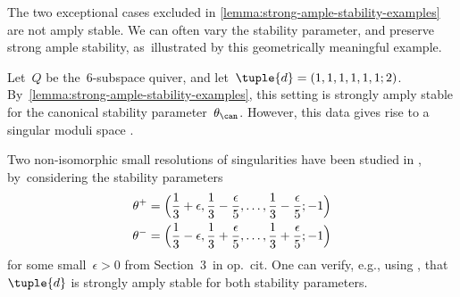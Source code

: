 The two exceptional cases excluded in \cref{lemma:strong-ample-stability-examples}
are not amply stable.
We can often vary the stability parameter,
and preserve strong ample stability, as~illustrated by this geometrically meaningful example.
\begin{example}
Let~$Q$ be the~6-subspace quiver,
and let~$\tuple{d}=(1,1,1,1,1,1;2)$. By~\cref{lemma:strong-ample-stability-examples},
this setting is strongly amply stable for the canonical stability parameter~$\theta_\can$.
However, this data gives rise to a singular moduli space \cite{MR3778138,2202.08601}.

Two non-isomorphic small resolutions of singularities have been studied in \cite{MR3778138}, by~considering the stability parameters
\begin{equation*}
\begin{aligned}
\theta^+&=\Bigl( \frac{1}{3}+\epsilon,\frac{1}{3}-\frac{\epsilon}{5},\ldots,\frac{1}{3}-\frac{\epsilon}{5};-1 \Bigr) \\
\theta^-&=\Bigl( \frac{1}{3}-\epsilon,\frac{1}{3}+\frac{\epsilon}{5},\ldots,\frac{1}{3}+\frac{\epsilon}{5};-1 \Bigr)
\end{aligned}
\end{equation*}
for some small~$\epsilon>0$
from Section~3~in op.~cit.
One can verify, e.g., using \cite{quivertools},
that~$\tuple{d}$ is strongly amply stable for both stability parameters.
\end{example}

